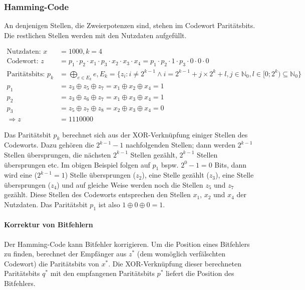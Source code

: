 \documentclass[a4paper, 14pt]{article}
\begin{document}
	\subsubsection{Hamming-Code}

	An denjenigen Stellen, die Zweierpotenzen sind, stehen im Codewort Paritätsbits.
	Die restlichen Stellen werden mit den Nutzdaten aufgefüllt.

	\begin{align*}
		\text{Nutzdaten: } x &= 1000, k = 4 \\
		\text{Codewort: } z &= p_1 \cdot p_2 \cdot x_1 \cdot p_3 \cdot x_2 \cdot x_3 \cdot x_4 = p_1 \cdot p_2 \cdot 1 \cdot p_3 \cdot 0 \cdot 0 \cdot 0 \\
		\text{Paritätsbits: } p_k &= \bigoplus_{e \in E_k} e, E_k = \{ z_i : i \neq 2^{k-1} \wedge i = 2^{k-1} + j \times 2^{k} + l, j \in \mathbb{N}_0, l \in [0; 2^k) \subseteq \mathbb{N}_0 \} \\
		p_1 &= z_3 \oplus z_5 \oplus z_7 = x_1 \oplus x_2 \oplus x_4 = 1 \\
		p_2 &= z_3 \oplus z_6 \oplus z_7 = x_1 \oplus x_3 \oplus x_4 = 1 \\
		p_3 &= z_5 \oplus z_7 \oplus z_8 = x_2 \oplus x_3 \oplus x_4 = 0 \\
		\Rightarrow z &= 1110000
	\end{align*}

	Das Paritätsbit $p_k$ berechnet sich aus der XOR-Verknüpfung einiger Stellen des Codeworts.
	Dazu gehören die $2^{k-1} - 1$ nachfolgenden Stellen; dann werden $2^{k-1}$ Stellen übersprungen, die nächsten $2^{k-1}$ Stellen gezählt, $2^{k-1}$ Stellen übersprungen etc.
	Im obigen Beispiel folgen auf $p_1$ bspw. $2^0 - 1 = 0$ Bits, dann wird eine ($2^{k-1} = 1$) Stelle übersprungen ($z_2$), eine Stelle gezählt ($z_3$), eine Stelle übersprungen ($z_4$) und auf gleiche Weise werden noch die Stellen $z_5$ und $z_7$ gezählt.
	Diese Stellen des Codeworts entsprechen den Stellen $x_1$, $x_2$ und $x_4$ der Nutzdaten.
	Das Paritätsbit $p_1$ ist also $1 \oplus 0 \oplus 0 = 1$.

	\paragraph{Korrektur von Bitfehlern}
	
	Der Hamming-Code kann Bitfehler korrigieren.
	Um die Position eines Bitfehlers zu finden, berechnet der Empfänger aus $z^*$ (dem womöglich verfälschten Codewort) die Paritätsbits von $x^*$.
	Die XOR-Verknüpfung dieser berechneten Paritätsbits $q^*$ mit den empfangenen Paritätsbits $p^*$ liefert die Position des Bitfehlers.
\end{document}
